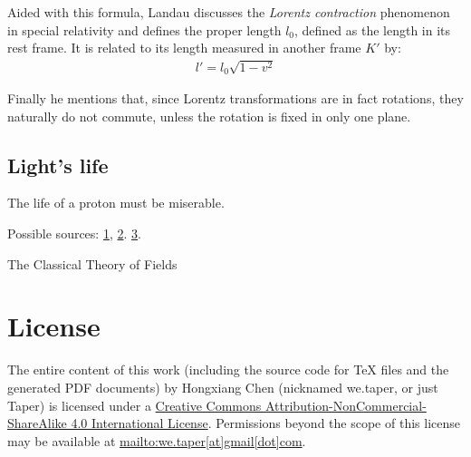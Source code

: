 \documentclass{article}
\numberwithin{equation}{subsection} %
\theoremstyle{definition}
\begin{document}
    Aided with this formula, Landau discusses the \textit{Lorentz
    contraction} phenomenon in special relativity and defines
    the proper length
    $l_0$, defined as the length in its rest frame. It is related
    to its length measured in another frame $K'$ by:
    \begin{align}
        l' = l_0 \sqrt{1-v^2}
    \end{align}

    Finally he mentions that, since Lorentz transformations are
    in fact rotations, they naturally do not commute, unless the
    rotation is fixed in only one plane.

    \subsection{Light's life}
    \label{sec:Lights_life}
    The life of a proton must be miserable.
    
    Possible sources: \href{http://physics.stackexchange.com/questions/16018/does-a-photon-in-vacuum-have-a-rest-frame}{1},
    \href{http://physics.stackexchange.com/questions/29082/would-time-freeze-if-you-could-travel-at-the-speed-of-light}{2}.
    \href{https://www.quora.com/What-does-the-frame-of-reference-of-a-photon-look-like}{3}.
\begin{thebibliography}{1}
     The Classical Theory of Fields
\end{thebibliography}
\printnomenclature
\section{License}
The entire content of this work (including the source code
for TeX files and the generated PDF documents) by 
Hongxiang Chen (nicknamed we.taper, or just Taper) is
licensed under a 
\href{http://creativecommons.org/licenses/by-nc-sa/4.0/}{Creative 
Commons Attribution-NonCommercial-ShareAlike 4.0 International 
License}. Permissions beyond the scope of this 
license may be available at \url{mailto:we.taper[at]gmail[dot]com}.
\end{document}
